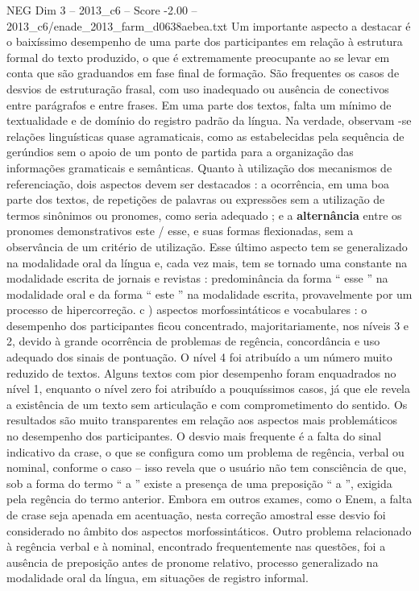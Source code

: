 \begin{textsample}{NEG Dim 3 – 2013\_c6 – Score -2.00 – 2013\_c6/enade\_2013\_farm\_d0638aebea.txt}
Um importante aspecto a destacar é o baixíssimo desempenho de uma parte dos participantes em relação à estrutura formal do texto produzido, o que é extremamente preocupante ao se levar em conta que são graduandos em fase final de formação.
São frequentes os casos de desvios de estruturação frasal, com uso inadequado ou ausência de conectivos entre parágrafos e entre frases.
Em uma parte dos textos, falta um mínimo de textualidade e de domínio do registro padrão da língua.
Na verdade, observam -se relações linguísticas quase agramaticais, como as estabelecidas pela sequência de gerúndios sem o apoio de um ponto de partida para a organização das informações gramaticais e semânticas.
Quanto à utilização dos mecanismos de referenciação, dois aspectos devem ser destacados : a ocorrência, em uma boa parte dos textos, de repetições de palavras ou expressões sem a utilização de termos sinônimos ou pronomes, como seria adequado ; e a \textbf{alternância} entre os pronomes demonstrativos este / esse, e suas formas flexionadas, sem a observância de um critério de utilização.
Esse último aspecto tem se generalizado na modalidade oral da língua e, cada vez mais, tem se tornado uma constante na modalidade escrita de jornais e revistas : predominância da forma “ esse ” na modalidade oral e da forma “ este ” na modalidade escrita, provavelmente por um processo de hipercorreção. c ) aspectos morfossintáticos e vocabulares : o desempenho dos participantes ficou concentrado, majoritariamente, nos níveis 3 e 2, devido à grande ocorrência de problemas de regência, concordância e uso adequado dos sinais de pontuação.
O nível 4 foi atribuído a um número muito reduzido de textos.
Alguns textos com pior desempenho foram enquadrados no nível 1, enquanto o nível zero foi atribuído a pouquíssimos casos, já que ele revela a existência de um texto sem articulação e com comprometimento do sentido.
Os resultados são muito transparentes em relação aos aspectos mais problemáticos no desempenho dos participantes.
O desvio mais frequente é a falta do sinal indicativo da crase, o que se configura como um problema de regência, verbal ou nominal, conforme o caso – isso revela que o usuário não tem consciência de que, sob a forma do termo “ a ” existe a presença de uma preposição “ a ”, exigida pela regência do termo anterior.
Embora em outros exames, como o Enem, a falta de crase seja apenada em acentuação, nesta correção amostral esse desvio foi considerado no âmbito dos aspectos morfossintáticos.
Outro problema relacionado à regência verbal e à nominal, encontrado frequentemente nas questões, foi a ausência de preposição antes de pronome relativo, processo generalizado na modalidade oral da língua, em situações de registro informal.

\end{textsample}
